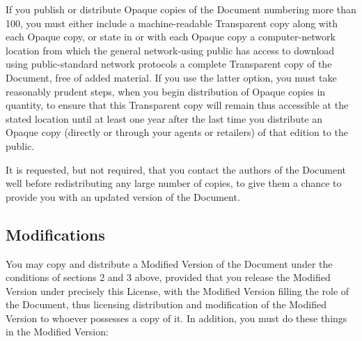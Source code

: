 \documentclass[11pt]{article}
\begin{document}
If you publish or distribute Opaque copies of the Document numbering
more than 100, you must either include a machine-readable Transparent
copy along with each Opaque copy, or state in or with each Opaque copy
a computer-network location from which the general network-using
public has access to download using public-standard network protocols
a complete Transparent copy of the Document, free of added material.
If you use the latter option, you must take reasonably prudent steps,
when you begin distribution of Opaque copies in quantity, to ensure
that this Transparent copy will remain thus accessible at the stated
location until at least one year after the last time you distribute an
Opaque copy (directly or through your agents or retailers) of that
edition to the public.

It is requested, but not required, that you contact the authors of the
Document well before redistributing any large number of copies, to give
them a chance to provide you with an updated version of the Document.

\subsection*{Modifications}

You may copy and distribute a Modified Version of the Document under
the conditions of sections 2 and 3 above, provided that you release
the Modified Version under precisely this License, with the Modified
Version filling the role of the Document, thus licensing distribution
and modification of the Modified Version to whoever possesses a copy
of it.  In addition, you must do these things in the Modified Version:
\end{document}
